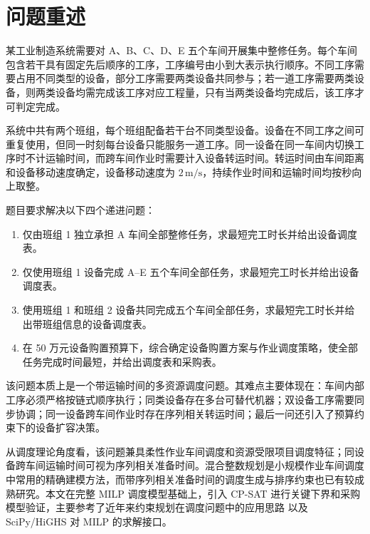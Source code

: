 \section{问题重述}

某工业制造系统需要对 A、B、C、D、E 五个车间开展集中整修任务。每个车间包含若干具有固定先后顺序的工序，工序编号由小到大表示执行顺序。不同工序需要占用不同类型的设备，部分工序需要两类设备共同参与；若一道工序需要两类设备，则两类设备均需完成该工序对应工程量，只有当两类设备均完成后，该工序才可判定完成。

系统中共有两个班组，每个班组配备若干台不同类型设备。设备在不同工序之间可重复使用，但同一时刻每台设备只能服务一道工序。同一设备在同一车间内切换工序时不计运输时间，而跨车间作业时需要计入设备转运时间。转运时间由车间距离和设备移动速度确定，设备移动速度为 $2\,\mathrm{m/s}$，持续作业时间和运输时间均按秒向上取整。

题目要求解决以下四个递进问题：
\begin{enumerate}[label=\textbf{问题\arabic*.}, leftmargin=2.8em]
  \item 仅由班组 1 独立承担 A 车间全部整修任务，求最短完工时长并给出设备调度表。
  \item 仅使用班组 1 设备完成 A--E 五个车间全部任务，求最短完工时长并给出设备调度表。
  \item 使用班组 1 和班组 2 设备共同完成五个车间全部任务，求最短完工时长并给出带班组信息的设备调度表。
  \item 在 50 万元设备购置预算下，综合确定设备购置方案与作业调度策略，使全部任务完成时间最短，并给出调度表和采购表。
\end{enumerate}

该问题本质上是一个带运输时间的多资源调度问题。其难点主要体现在：车间内部工序必须严格按链式顺序执行；同类设备存在多台可替代机器；双设备工序需要同步协调；同一设备跨车间作业时存在序列相关转运时间；最后一问还引入了预算约束下的设备扩容决策。

从调度理论角度看，该问题兼具柔性作业车间调度和资源受限项目调度特征；同设备跨车间运输时间可视为序列相关准备时间。混合整数规划是小规模作业车间调度中常用的精确建模方法\cite{KuBeck2016}，而带序列相关准备时间的调度生成与排序约束也已有较成熟研究\cite{Artigues2005}。本文在完整 MILP 调度模型基础上，引入 CP-SAT 进行关键下界和采购模型验证，主要参考了近年来约束规划在调度问题中的应用思路\cite{PyJobShop2025,ORToolsCPSAT} 以及 SciPy/HiGHS 对 MILP 的求解接口\cite{SciPyMilp}。
